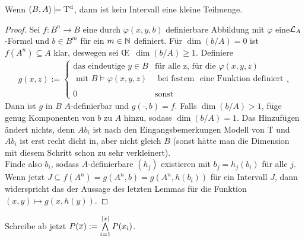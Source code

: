 \begin{theorem}\label{Kleinheit}
	Wenn $(B,A)\models\operatorname{T^d}$, dann ist kein Intervall eine kleine Teilmenge.
\end{theorem}
\begin{proof}
	Sei $f:B^n\rightarrow B$ eine durch $\varphi(x,y,b)$ definierbare Abbildung mit $\varphi$ eine\linebreak$\mathcal{L}_A$-Formel und $b\in B^m$ für ein $m\in\mathbb{N}$ definiert. Für $\dim(b/A)=0$ ist $f(A^n)\subseteq A$ klar, deswegen sei \OE\ $\dim(b/A)\geq1$. Definiere
	\begin{align*}
	g(x,z):=\left\{\begin{array}{ll}
	\text{das eindeutige }y\in B &\text{für alle z, für die }\varphi(x,y,z)\\
	\text{ mit }B\models\varphi(x,y,z) &\text{ bei festem }\text{ eine Funktion definiert}\\
	\ &\ \\
	0 &\text{sonst}
	\end{array}\right.,
	\end{align*}
	Dann ist $g$ in $B$ $A$-definierbar und $g(\cdot,b)=f$. Falls $\dim(b/A)>1$, füge genug Komponenten von $b$ zu $A$ hinzu, sodass $\dim(b/A)=1$. Das Hinzufügen ändert nichts, denn $Ab_i$ ist nach den Eingangsbemerkungen Modell von T und $Ab_i$ ist erst recht dicht in, aber nicht gleich $B$ (sonst hätte man die Dimension mit diesem Schritt schon zu sehr verkleinert).\\
	Finde also $b_i$, sodass $A$-definierbare $(h_j)$ existieren mit $b_j=h_j(b_i)$ für alle $j$. Wenn jetzt $J\subseteq f(A^n)=g(A^n,b)=g(A^n,h(b_i))$ für ein Intervall $J$, dann widerspricht das der Aussage des letzten Lemmas für die Funktion $(x,y)\mapsto g(x,h(y))$.
\end{proof}

\begin{definition}
	Schreibe ab jetzt $P(\overline{x}):=\bigwedge\limits_{i=1}^{\left| x \right|}P(x_i)$.
\end{definition}

